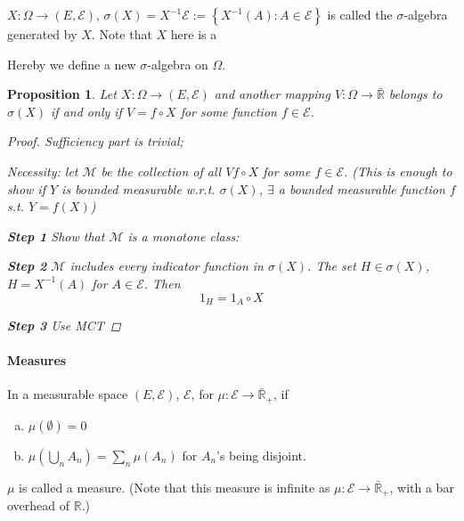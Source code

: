 \documentclass[11pt]{article}
\newcommand{\m}{\mathcal}
\newcommand{\R}{{\mathbb R}}
\newtheorem{proposition}[theorem]{Proposition}
\begin{document}
      \begin{definition}
        $X : \Omega \to ( E , \mathcal E)$, $\sigma (X) = X^{-1} \mathcal E := \left\{
          X^{-1}(A) : A \in \mathcal E \right\}$ is called the $\sigma$-algebra
          generated by $X$. Note that $X$ here is a

          Hereby we define a new $\sigma$-algebra on $\Omega$. 
        \end{definition}

        \begin{proposition}
          Let $X : \Omega \to (E, \mathcal E)$ and another mapping $V : \Omega \to \bar
          \R$ belongs to $\sigma (X)$ if and only if $V = f \circ X $ for some function
          $f \in \mathcal E$. 
          \begin{proof}
            Sufficiency part is trivial; 

            Necessity: let $\mathcal M $ be the collection of all $V  f\circ X$ for some
            $f \in\mathcal E$. (This is enough to show if $Y$ is bounded measurable
            w.r.t. $\sigma (X)$, $\exists$ a bounded measurable function $f$ s.t. $Y =
            f(X)$)

            \textbf{Step 1} Show that $\mathcal M $ is a monotone class: 
            \label{homework}

            \textbf{Step 2} $\mathcal M$ includes every indicator function in $\sigma
            (X)$. The set $H \in \sigma (X)$, $H = X^{-1}(A)$ for $A \in \mathcal E$.
            Then 
            \[
              1 _ H = 1 _ A \circ X
            \]

            \textbf{Step 3 } Use MCT



          \end{proof}
        \end{proposition}

        \paragraph{Measures}
        \begin{definition}
          In a measurable space $(E, \mathcal E)$, $\m E$, for $\mu : \mathcal E \to
          \bar \R_+$, if 
          \begin{enumerate}[(a)]
            \item $\mu (\emptyset) = 0$
            \item $\mu ( \bigcup _ n A_n) = \sum_n \mu (A_n)$ for $A_n$'s being disjoint.
          \end{enumerate}
          $\mu$ is called a measure. (Note that this measure is infinite as $\mu: \mathcal E
          \to \bar \R_+$, with a  bar overhead of $\R$.)
        \end{definition}
\end{document}
